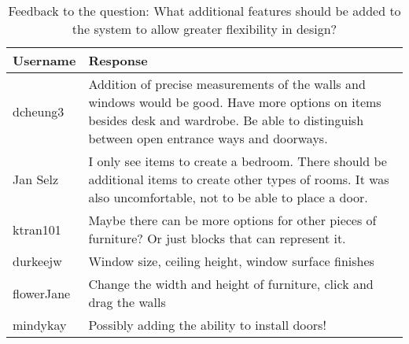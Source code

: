 \begin{table}[!ht]
\centering
\caption[What additional features should be added to the system to allow greater flexibility in design?]{Feedback to the question: What additional features should be added to the system to allow greater flexibility in design?}
\label{fig:features}
\begin{tabular}{|p{}|p{}|}
\hline
\rowcolor[HTML]{EFEFEF} 
Username   & Response                                                                                                                                                                                       \\ \hline
dcheung3   & Addition of precise measurements of the walls and windows would be good. Have more options on items besides desk and wardrobe. Be able to distinguish between open entrance ways and doorways. \\ \hline
Jan Selz   & I only see items to create a bedroom.  There should be additional items to create other types of rooms.  It was also uncomfortable, not to be able to place a door.                            \\ \hline
ktran101   & Maybe there can be more options for other pieces of furniture? Or just blocks that can represent it.                                                                                           \\ \hline
durkeejw   & Window size, ceiling height, window surface finishes                                                                                                                                           \\ \hline
flowerJane & Change the width and height of furniture, click and drag the walls                                                                                                                             \\ \hline
mindykay   & Possibly adding the ability to install doors!                                                                                                                                                  \\ \hline
\end{tabular}
\end{table}


